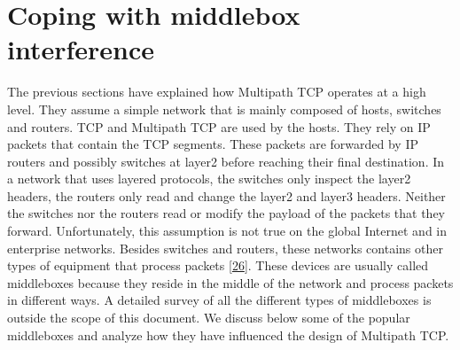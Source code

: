 \documentclass[letterpaper,10pt,english]{sphinxmanual}
\begin{document}
\section{Coping with middlebox interference}
\label{\detokenize{mptcp:coping-with-middlebox-interference}}\label{\detokenize{mptcp:mptcp-middlebox}}
\sphinxAtStartPar
The previous sections have explained how Multipath TCP operates at a high level. They assume a simple network that is mainly composed of hosts, switches and routers. TCP and Multipath TCP are used by the hosts. They rely on IP packets that contain the TCP segments. These packets are forwarded by IP routers and possibly switches at layer\sphinxhyphen{}2 before reaching their final destination. In a network that uses layered protocols, the switches only inspect the layer\sphinxhyphen{}2 headers, the routers only read and change the layer\sphinxhyphen{}2 and layer\sphinxhyphen{}3 headers. Neither the switches nor the routers read or modify the payload of the packets that they forward. Unfortunately, this assumption is not true on the global Internet and in enterprise networks. Besides switches and routers, these networks contains other types of equipment that process packets {[}\hyperlink{cite.biblio:id8916}{26}{]}. These devices are usually called middleboxes because they reside in the middle of the network and process packets in different ways. A detailed survey of all the different types of middleboxes is outside the scope of this document. We discuss below some of the popular middleboxes and analyze how they have influenced the design of Multipath TCP.
\end{document}
